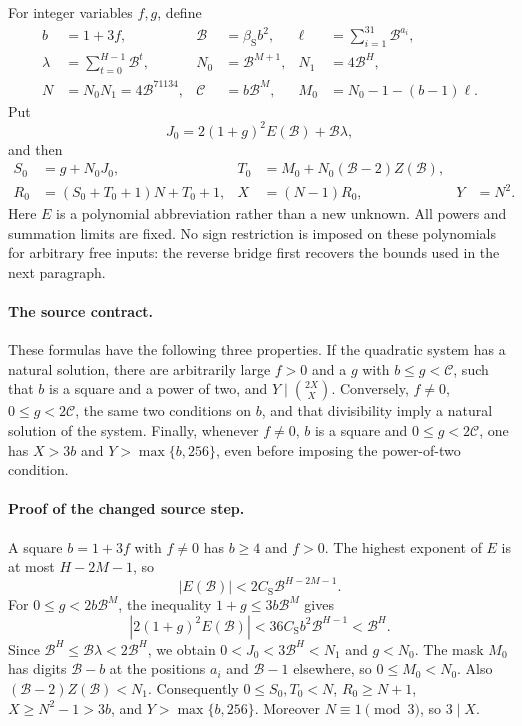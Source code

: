 For integer variables $f,g$, define
\begin{align*}
 b&=1+3f,& \mathcal B&=\beta_{\mathrm S}b^2,&
 \ell&=\sum_{i=1}^{31}\mathcal B^{a_i},\\
 \lambda&=\sum_{t=0}^{H-1}\mathcal B^t,&
 N_0&=\mathcal B^{M+1},& N_1&=4\mathcal B^H,\\
 N&=N_0N_1=4\mathcal B^{71134},&
 \mathscr C&=b\mathcal B^M,&
 M_0&=N_0-1-(b-1)\ell.
\end{align*}
Put
\[
 J_0=2(1+g)^2E(\mathcal B)+\mathcal B\lambda,
\]
and then
\begin{align*}
 S_0&=g+N_0J_0,&
 T_0&=M_0+N_0(\mathcal B-2)Z(\mathcal B),\\
 R_0&=(S_0+T_0+1)N+T_0+1,&
 X&=(N-1)R_0,&Y&=N^2.
\end{align*}
Here $E$ is a polynomial abbreviation rather than a new unknown.
All powers and summation limits are fixed. No sign restriction is
imposed on these polynomials for arbitrary free inputs: the reverse
bridge first recovers the bounds used in the next paragraph.

\paragraph{The source contract.}
These formulas have the following three properties.
If the quadratic system has a natural solution, there are arbitrarily
large $f>0$ and a $g$ with $b\le g<\mathscr C$, such that $b$ is a
square and a power of two, and $Y\mid\binom{2X}{X}$.
Conversely, $f\ne0$, $0\le g<2\mathscr C$, the same two conditions on
$b$, and that divisibility imply a natural solution of the system.
Finally, whenever $f\ne0$, $b$ is a square and $0\le g<2\mathscr C$,
one has $X>3b$ and $Y>\max\{b,256\}$, even before imposing the
power-of-two condition.

\paragraph{Proof of the changed source step.}
A square $b=1+3f$ with $f\ne0$ has $b\ge4$ and $f>0$.
The highest exponent of $E$ is at most $H-2M-1$, so
\[
 |E(\mathcal B)|<2C_{\mathrm S}\mathcal B^{H-2M-1}.
\]
For $0\le g<2b\mathcal B^M$, the inequality
$1+g\le3b\mathcal B^M$ gives
\[
 |2(1+g)^2E(\mathcal B)|
 <36C_{\mathrm S}b^2\mathcal B^{H-1}<\mathcal B^H.
\]
Since $\mathcal B^H\le\mathcal B\lambda<2\mathcal B^H$,
we obtain $0<J_0<3\mathcal B^H<N_1$ and $g<N_0$.
The mask $M_0$ has digits $\mathcal B-b$ at the positions $a_i$
and $\mathcal B-1$ elsewhere, so $0\le M_0<N_0$.
Also $(\mathcal B-2)Z(\mathcal B)<N_1$.
Consequently $0\le S_0,T_0<N$, $R_0\ge N+1$,
$X\ge N^2-1>3b$, and $Y>\max\{b,256\}$.
Moreover $N\equiv1\pmod3$, so $3\mid X$.

